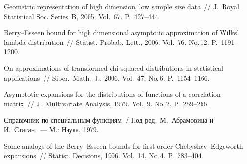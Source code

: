 \begin{multicols}{2}
\addtocounter{table}{1}


{\small\frenchspacing
{%
\begin{thebibliography}{9}

Geometric representation of high dimension,
low sample size data~// J.~Royal Statistical Soc. Series~B,  2005. Vol.~67. P.~427--444.

Berry--Esseen bound for high dimensional asymptotic approximation of Wilks' lambda distribution~// 
Statist. Probab. Lett.,  2006. Vol.~76.  No.\,12. P.~1191--1200.

On approximations
of transformed chi-squared distributions in statistical applications~//
 Siber.\ Math.\ J., 2006. Vol.~47. No.\,6. P.~1154--1166.

Asymptotic expansions for the distributions of functions of a correlation matrix~//
J.\ Multivariate Analysis, 1979. Vol.~9. No.\,2. P.~259--266.


Справочник по специальным функциям~/ Под ред.\ М.~Абрамовица и И.~Стиган.~--- М.: Наука, 1979.

\label{end\stat}

Some analogs of the Berry--Esseen bounds for first-order
Chebyshev--Edgeworth expansions~// Statist. Decisions, 1996. Vol.~14. No.\,4. P.~383--404.
 \end{thebibliography}
}
}

\end{multicols}